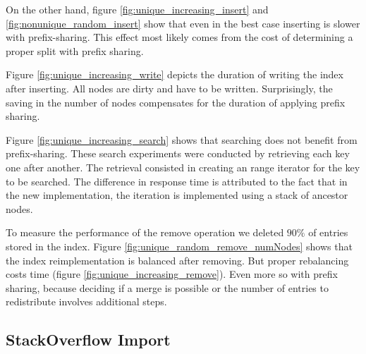 \documentclass[11pt,a4paper,oneside]{article}
\begin{document}
On the other hand, figure \ref{fig:unique_increasing_insert} and \ref{fig:nonunique_random_insert} show that even in the best case inserting is slower with prefix-sharing. 
This effect most likely comes from the cost of determining a proper split with prefix sharing.

Figure \ref{fig:unique_increasing_write} depicts the duration of writing the index after inserting. 
All nodes are dirty and have to be written.
Surprisingly, the saving in the number of nodes compensates for the duration of applying prefix sharing.

Figure \ref{fig:unique_increasing_search} shows that searching does not benefit from prefix-sharing. These search experiments were conducted by retrieving each key one after another. The retrieval consisted in creating an range iterator for the key to be searched. The difference in response time is attributed to the fact that in the new implementation, the iteration is implemented using a stack of ancestor nodes.

To measure the performance of the remove operation we deleted $90\%$ of entries stored in the index.
Figure \ref{fig:unique_random_remove_numNodes} shows that the index reimplementation is balanced after removing. 
But proper rebalancing costs time (figure \ref{fig:unique_increasing_remove}). 
Even more so with prefix sharing, because deciding if a merge is possible or the number of entries to redistribute involves additional steps.



\subsection{StackOverflow Import} %
\label{sub:stackoverflow_import}
\end{document}
